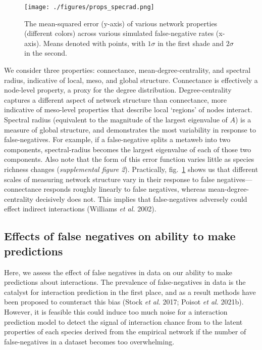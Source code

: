 \documentclass[11pt]{article}
\begin{document}
\begin{figure}
\hypertarget{fig:properties}{%
\centering
\texttt{[image: ./figures/props\_specrad.png]}
\caption{The mean-squared error (y-axis) of various network properties
(different colors) across various simulated false-negative rates
(x-axis). Means denoted with points, with \(1\sigma\) in the first shade
and \(2\sigma\) in the second.}\label{fig:properties}
}
\end{figure}

We consider three properties: connectance, mean-degree-centrality, and
spectral radius, indicative of local, meso, and global structure.
Connectance is effectively a node-level property, a proxy for the degree
distribution. Degree-centrality captures a different aspect of network
structure than connectance, more indicative of meso-level properties
that describe local `regions' of nodes interact. Spectral radius
(equivalent to the magnitude of the largest eigenvalue of \(A\)) is a
measure of global structure, and demonstrates the most variability in
response to false-negatives. For example, if a false-negative splits a
metaweb into two components, spectral-radius becomes the largest
eigenvalue of each of those two components. Also note that the form of
this error function varies little as species richness changes
(\emph{supplemental figure 2}). Practically, fig.~\ref{fig:properties}
shows us that different scales of measuring network structure vary in
their response to false negatives---connectance responds roughly
linearly to false negatives, whereas mean-degree-centrality decisively
does not. This implies that false-negatives adversely could effect
indirect interactions (Williams \emph{et al.} 2002).

\hypertarget{effects-of-false-negatives-on-ability-to-make-predictions}{%
\subsection{Effects of false negatives on ability to make
predictions}\label{effects-of-false-negatives-on-ability-to-make-predictions}}

Here, we assess the effect of false negatives in data on our ability to
make predictions about interactions. The prevalence of false-negatives
in data is the catalyst for interaction prediction in the first place,
and as a result methods have been proposed to counteract this bias
(Stock \emph{et al.} 2017; Poisot \emph{et al.} 2021b). However, it is
feasible this could induce too much noise for a interaction prediction
model to detect the signal of interaction chance from to the latent
properties of each species derived from the empirical network if the
number of false-negatives in a dataset becomes too overwhelming.
\end{document}
